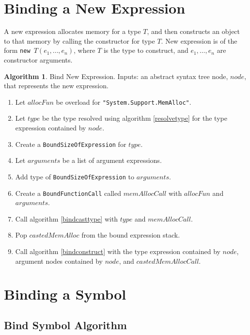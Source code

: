 \documentclass[a4paper,oneside,11pt]{book}
\theoremstyle{definition}
\newtheorem{algo}{Algorithm}[section]
\begin{document}
\section{Binding a New Expression}

A new expression allocates memory for a type $T$, and then constructs an object to that memory by calling the constructor for type $T$.
New expression is of the form \verb|new |$T(e_1, \ldots, e_n)$, where $T$ is the type to construct, and $e_1, \ldots, e_n$ are constructor arguments.

\begin{algo}\label{bindnew} Bind New Expression.
Inputs: an abstract syntax tree node, $node$, that represents the new expression.
\begin{enumerate}
\item
Let $allocFun$ be overload for \verb|"System.Support.MemAlloc"|.
\item
Let $type$ be the type resolved using algorithm \ref{resolvetype} for the type expression contained by $node$.
\item
Create a \verb|BoundSizeOfExpression| for $type$.
\item
Let $arguments$ be a list of argument expressions.
\item
Add type of \verb|BoundSizeOfExpression| to $arguments$.
\item
Create a \verb|BoundFunctionCall| called $memAllocCall$ with $allocFun$ and $arguments$.
\item
Call algorithm \ref{bindcasttype} with $type$ and $memAllocCall$.
\item
Pop $castedMemAlloc$ from the bound expression stack.
\item
Call algorithm \ref{bindconstruct} with the type expression contained by $node$, argument nodes contained by $node$, and $castedMemAllocCall$.
\end{enumerate}
\end{algo}

\section{Binding a Symbol}

\subsection{Bind Symbol Algorithm}
\end{document}
